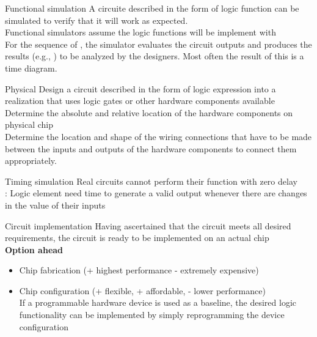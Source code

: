     \begin{parag}{Functional simulation}
        A circuite described in the form of logic function can be simulated to verify that it will work as expected.\\
        Functional simulators assume the logic functions will be implement with \\
       For the sequence of , the simulator evaluates the circuit outputs and produces the results (e.g., ) to be analyzed by the designers. Most often the result of this is a time diagram.
    \end{parag}
    
    
    \begin{parag}{Physical Design}
         a circuit described in the form of logic expression into a realization that uses logic gates or other hardware components available\\
         Determine the absolute and relative location of the hardware components on physical chip\\
         Determine the location and shape of the wiring connections that have to be made between the inputs and outputs of the hardware components to connect them appropriately.
    \end{parag}
    
    
   \begin{parag}{Timing simulation}
       Real circuits cannot perform their function with zero delay\\
       : Logic element need time to generate a valid output whenever there are changes in the value of their inputs\\
   
   \end{parag}
   
   \begin{parag}{Circuit implementation}
       Having ascertained that the circuit meets all desired requirements, the circuit is ready to be implemented on an actual chip\\
       \textbf{Option ahead}
       \begin{itemize}
           \item Chip fabrication (+ highest performance - extremely expensive)
           \item Chip configuration (+ flexible, + affordable, - lower performance)\\
    If a programmable hardware device is used as a baseline, the desired logic functionality can be implemented by simply reprogramming the device configuration
       \end{itemize}
   
   \end{parag}
   
